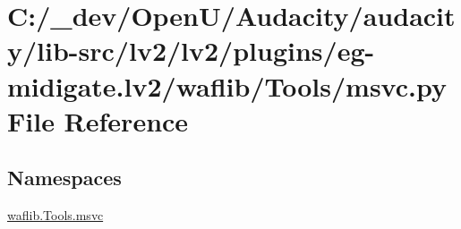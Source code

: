 \hypertarget{lv2_2plugins_2eg-midigate_8lv2_2waflib_2_tools_2msvc_8py}{}\section{C\+:/\+\_\+dev/\+Open\+U/\+Audacity/audacity/lib-\/src/lv2/lv2/plugins/eg-\/midigate.lv2/waflib/\+Tools/msvc.py File Reference}
\label{lv2_2plugins_2eg-midigate_8lv2_2waflib_2_tools_2msvc_8py}
\subsection*{Namespaces}
\begin{DoxyCompactItemize}
\item 
 \hyperlink{namespacewaflib_1_1_tools_1_1msvc}{waflib.\+Tools.\+msvc}
\end{DoxyCompactItemize}
